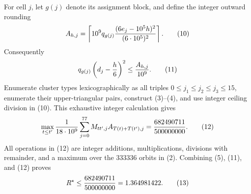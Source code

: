 For cell \(j\), let \(g(j)\) denote its assignment block, and define the integer outward rounding
\[
A_{h,j}=\left\lceil
10^9q_{g(j)}{(6e_j-10^5h)^2\over(6\cdot10^5)^2}
\right\rceil.                                                              \tag{10}
\]
Consequently
\[
q_{g(j)}\left(d_j-{h\over6}\right)^2\le {A_{h,j}\over10^9}.              \tag{11}
\]
Enumerate cluster types lexicographically as all triples \(0\le j_1\le j_2\le j_3\le15\), enumerate their upper-triangular pairs, construct (3)--(4), and use integer ceiling division in (10).  This exhaustive integer calculation gives
\[
\max_{t\le t'}{1\over18\cdot10^9}
 \sum_{j=0}^{77}M_{tt',j}A_{T(t)+T(t'),j}
 ={682490711\over500000000}.                                                \tag{12}
\]
All operations in (12) are integer additions, multiplications, divisions with remainder, and a maximum over the \(333336\) orbits in (2).  Combining (5), (11), and (12) proves
\[
R^\star\le {682490711\over500000000}=1.364981422.                          \tag{13}
\]

